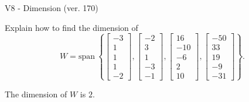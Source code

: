 \begin{exercise}
  \begin{exerciseTitle}V8 - Dimension (ver. 170)\end{exerciseTitle}
  \begin{exerciseStatement}
    Explain how to find the dimension of 
\[W=\mathrm{span}\ \left\{\left[\begin{array}{r}
-3 \\
1 \\
1 \\
1 \\
-2
\end{array}\right] , \left[\begin{array}{r}
-2 \\
3 \\
1 \\
-3 \\
-1
\end{array}\right] , \left[\begin{array}{r}
16 \\
-10 \\
-6 \\
2 \\
10
\end{array}\right] , \left[\begin{array}{r}
-50 \\
33 \\
19 \\
-9 \\
-31
\end{array}\right]\right\}.\]



  \end{exerciseStatement}
  \begin{exerciseAnswer}
   The dimension of \(W\) is  \(2\).
  


  \end{exerciseAnswer}
\end{exercise}